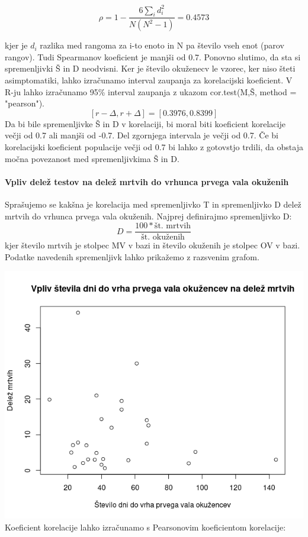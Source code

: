 \documentclass[a4paper,11pt]{article}
\begin{document}
\begin{center}
\[\rho = 1 - \frac{6\sum_{i}{}d_i^2}{N(N^2 - 1)} = 0.4573\]
\end{center}

kjer je \( d_i \) razlika med rangoma za i-to enoto in N pa število vseh enot (parov rangov). Tudi Spearmanov koeficient je manjši od 0.7. Ponovno slutimo, da sta si spremenljivki Š in D neodvisni.
Ker je število okuženecv le vzorec, ker niso šteti asimptomatiki, lahko izračunamo interval zaupanja za korelacijski koeficient. V R-ju lahko izračunamo 95\% interval zaupanja z ukazom cor.test(M,Š, method = "pearson").
\[[r - \Delta, r + \Delta] = [0.3976, 0.8399]\]
Da bi bile spremenljivke Š in D v korelaciji, bi moral biti koeficient korelacije večji od 0.7 ali manjši od -0.7. Del zgornjega intervala je večji od 0.7. Če bi korelacijski koeficient populacije večji od 0.7 bi lahko z gotovstjo trdili, da obstaja močna povezanost med spremenljivkima Š in D.

\paragraph{Vpliv delež testov na delež mrtvih do vrhunca prvega vala okuženih}
Sprašujemo se kakšna je korelacija med spremenljivko T in spremenljivko D delež mrtvih do vrhunca prvega vala okuženih. Najprej definirajmo spremenljivko D:
\[D = \frac{100 * \text{št. mrtvih}}{\text{št. okuženih}}\]
kjer število mrtvih je stolpec MV v bazi in število okuženih je stolpec OV v bazi. Podatke navedenih spremenljivk lahko prikažemo z razsvenim grafom.

\includegraphics[scale=0.6]{vpliv_stevila_dni_do_peaka_okuzencev_na_fatalnost}
Koeficient korelacije lahko izračunamo s Pearsonovim koeficientom korelacije:
\end{document}
